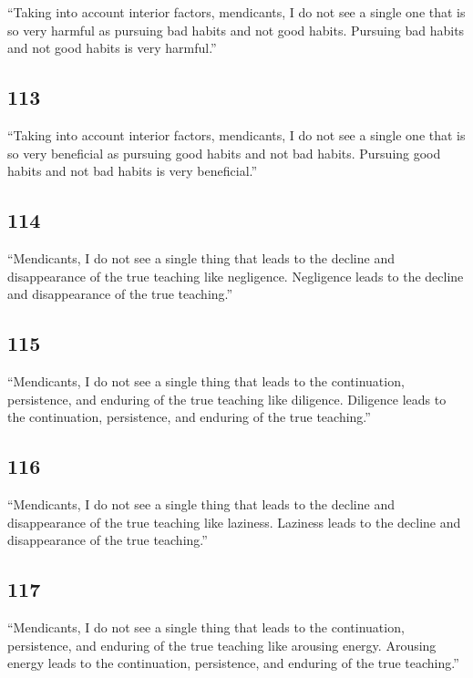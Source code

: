 \documentclass[12pt,openany]{book}%
\begin{document}
“Taking into account interior factors, mendicants, I do not see a single one that is so very harmful as pursuing bad habits and not good habits. Pursuing bad habits and not good habits is very harmful.” 

\subsection*{113 }

“Taking into account interior factors, mendicants, I do not see a single one that is so very beneficial as pursuing good habits and not bad habits. Pursuing good habits and not bad habits is very beneficial.” 

\subsection*{114 }

“Mendicants, I do not see a single thing that leads to the decline and disappearance of the true teaching like negligence. Negligence leads to the decline and disappearance of the true teaching.” 

\subsection*{115 }

“Mendicants, I do not see a single thing that leads to the continuation, persistence, and enduring of the true teaching like diligence. Diligence leads to the continuation, persistence, and enduring of the true teaching.” 

\subsection*{116 }

“Mendicants, I do not see a single thing that leads to the decline and disappearance of the true teaching like laziness. Laziness leads to the decline and disappearance of the true teaching.” 

\subsection*{117 }

“Mendicants, I do not see a single thing that leads to the continuation, persistence, and enduring of the true teaching like arousing energy. Arousing energy leads to the continuation, persistence, and enduring of the true teaching.” 
\end{document}
